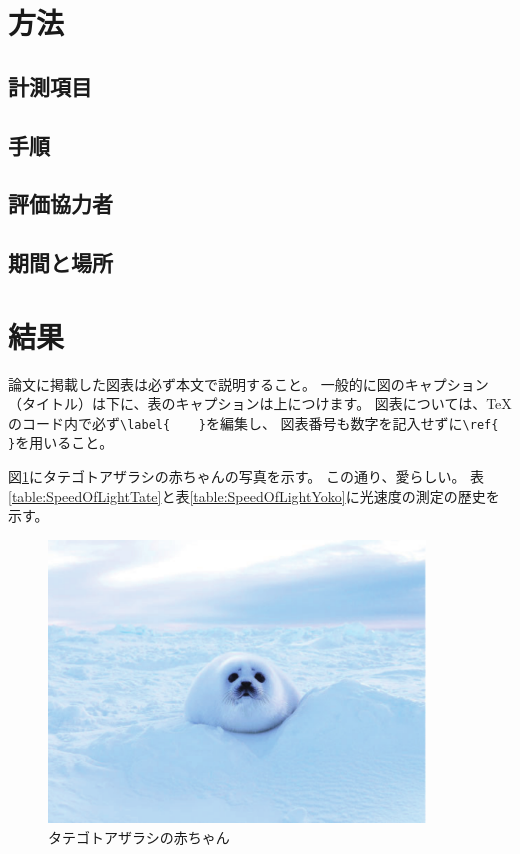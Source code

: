 \documentclass[11pt,a4paper]{ltjsreport}
\begin{document}
    \section{方法}
    \subsection{計測項目}
    \subsection{手順}
    \subsection{評価協力者}
    \subsection{期間と場所}

    \section{結果}
    論文に掲載した図表は必ず本文で説明すること。
    一般的に図のキャプション（タイトル）は下に、表のキャプションは上につけます。
    図表については、TeXのコード内で必ず\verb#\label{    }#を編集し、
    図表番号も数字を記入せずに\verb#\ref{    }#を用いること。

    図\ref{figure:Phoca_groenlandica}にタテゴトアザラシの赤ちゃんの写真を示す。
   この通り、愛らしい。
    表\ref{table:SpeedOfLightTate}と表\ref{table:SpeedOfLightYoko}に光速度の測定の歴史を示す。


    \begin{figure}[htbp]
        \begin{center}
        \includegraphics[width=100mm]{hoca_groenlandica.pdf}
        \caption{タテゴトアザラシの赤ちゃん}
        \label{figure:Phoca_groenlandica}
        \end{center}
    \end{figure} 
\end{document}
